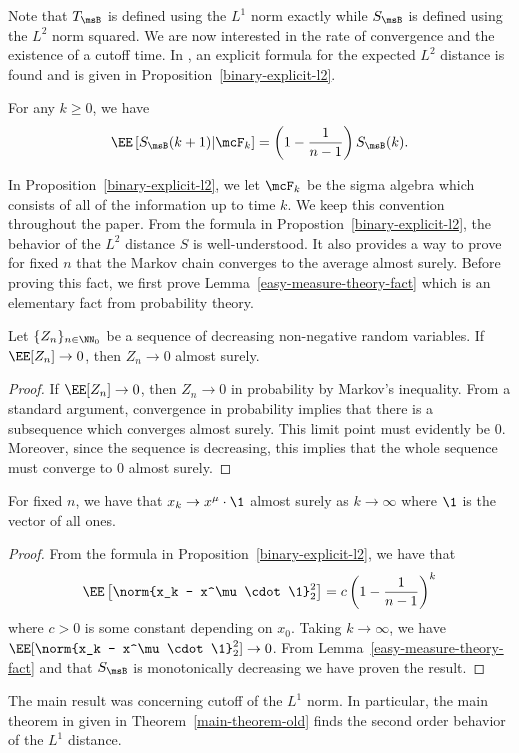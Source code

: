 \documentclass[12pt]{article}
\begin{document}
Note that $T_\msB$ is defined using the $L^1$ norm exactly while $S_\msB$ is defined using the $L^2$ norm squared. We are now interested in the rate of convergence and the existence of a cutoff time. In \cite{chatterjee2021phase}, an explicit formula for the expected $L^2$ distance is found and is given in Proposition~\ref{binary-explicit-l2}.

\begin{prop} \label{binary-explicit-l2}
	For any $k \geq 0$, we have 
	\[
		\EE \left [ S_\msB(k+1) | \mcF_k \right ] = \left ( 1 - \frac{1}{n-1} \right ) S_\msB(k).
	\]	
\end{prop}

In Proposition~\ref{binary-explicit-l2}, we let $\mcF_k$ be the sigma algebra which consists of all of the information up to time $k$. We keep this convention throughout the paper. From the formula in Propostion~\ref{binary-explicit-l2}, the behavior of the $L^2$ distance $S$ is well-understood. It also provides a way to prove for fixed $n$ that the Markov chain converges to the average almost surely. Before proving this fact, we first prove Lemma~\ref{easy-measure-theory-fact} which is an elementary fact from probability theory. 

\begin{lem} \label{easy-measure-theory-fact}
	Let $\{Z_n\}_{n \in \NN_0}$ be a sequence of decreasing non-negative random variables. If $\EE[Z_n] \to 0$, then $Z_n \to 0$ almost surely. 
\end{lem}
\begin{proof}
	If $\EE[Z_n] \to 0$, then $Z_n \to 0$ in probability by Markov's inequality. From a standard argument, convergence in probability implies that there is a subsequence which converges almost surely. This limit point must evidently be $0$. Moreover, since the sequence is decreasing, this implies that the whole sequence must converge to $0$ almost surely. 
\end{proof}

\begin{prop}
	For fixed $n$, we have that $x_k \to x^\mu \cdot \1$ almost surely as $k \to \infty$ where $\1$ is the vector of all ones. 
\end{prop}
\begin{proof}
	From the formula in Proposition~\ref{binary-explicit-l2}, we have that 
	\[
		\EE \left [ \norm{x_k - x^\mu \cdot \1}_2^2 \right ] = c \left ( 1 - \frac{1}{n-1} \right )^k 
	\]
	where $c > 0$ is some constant depending on $x_0$. Taking $k \to \infty$, we have $\EE [ \norm{x_k - x^\mu \cdot \1}_2^2 ] \to 0$. From Lemma~\ref{easy-measure-theory-fact} and that $S_\msB$ is monotonically decreasing we have proven the result.
\end{proof}
The main result \cite{chatterjee2021phase} was concerning cutoff of the $L^1$ norm. In particular, the main theorem in \cite{chatterjee2021phase} given in Theorem~\ref{main-theorem-old} finds the second order behavior of the $L^1$ distance. 
\end{document}
